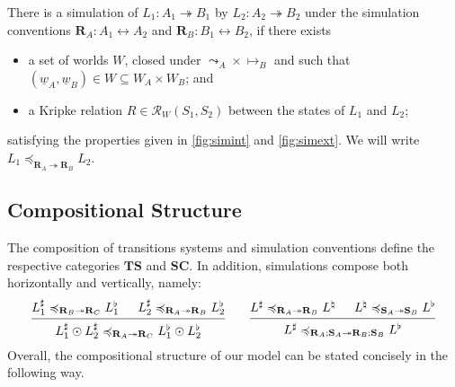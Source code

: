\documentclass[acmsmall,screen,review,anonymous]{acmart}
\renewcommand{\preceq}{\preccurlyeq}
\newcommand{\intl}[1]{\underline{#1}}
\begin{document}
\begin{definition}
There is a simulation
of $L_1 : A_1 \twoheadrightarrow B_1$
by $L_2 : A_2 \twoheadrightarrow B_2$
under the simulation conventions
$\mathbf{R}_A : A_1 \leftrightarrow A_2$ and
$\mathbf{R}_B : B_1 \leftrightarrow B_2$,
if there exists
\begin{itemize}
\item a set of worlds $W$,
closed under ${\leadsto_A} \times {\mapsto_B}$ and
such that
$(\intl{w}_A, \intl{w}_B) \in W \subseteq W_A \times W_B$;
and
\item
a Kripke relation $R \in \mathcal{R}_W(S_1, S_2)$
between the states of $L_1$ and $L_2$;
\end{itemize}
satisfying the properties given in
\autoref{fig:simint} and
\autoref{fig:simext}.
We will write
$L_1 \preceq_{\mathbf{R}_A \twoheadrightarrow \mathbf{R}_B} L_2$.
\end{definition}


\subsection{Compositional Structure} \label{sec:base:double} %

The composition of transitions systems and simulation conventions
define the respective categories $\mathbf{TS}$ and $\mathbf{SC}$.
In addition,
simulations compose both horizontally and vertically,
namely:
\[
  \begin{prooftree}
    \hypo{
      L_1^\sharp
      \preceq_{\mathbf{R}_B \twoheadrightarrow \mathbf{R}_C}
      L_1^\flat}
    \hypo{
      L_2^\sharp
      \preceq_{\mathbf{R}_A \twoheadrightarrow \mathbf{R}_B}
      L_2^\flat}
    \infer2{
      L_1^\sharp \odot L_2^\sharp
      \preceq_{\mathbf{R}_A \twoheadrightarrow \mathbf{R}_C}
      L_1^\flat \odot L_2^\flat}
  \end{prooftree}
  \qquad
  \begin{prooftree}
    \hypo{L^\sharp
      \preceq_{\mathbf{R}_A \twoheadrightarrow \mathbf{R}_B}
      L^\natural}
    \hypo{L^\natural
      \preceq_{\mathbf{S}_A \twoheadrightarrow \mathbf{S}_B}
      L^\flat}
    \infer2{L^\sharp
      \preceq_{\mathbf{R}_A \mathbin; \mathbf{S}_A \twoheadrightarrow
	   \mathbf{R}_B \mathbin; \mathbf{S}_B}
      L^\flat}
  \end{prooftree}
\]
Overall,
the compositional structure of our model
can be stated concisely in the following way.
\end{document}
